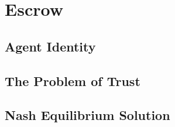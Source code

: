 \chapter{Escrow}

\section{Agent Identity}

\section{The Problem of Trust}

\section{Nash Equilibrium Solution}
